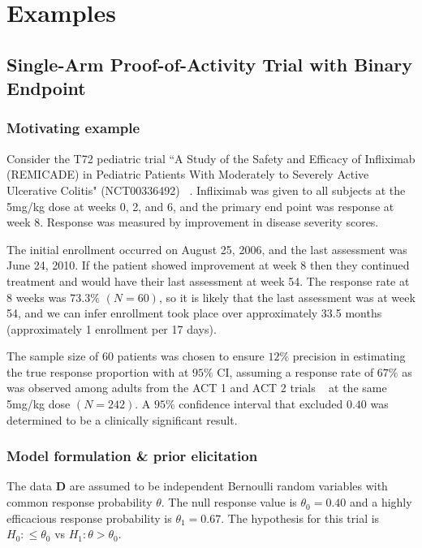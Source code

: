 \documentclass[12pt]{article}
\begin{document}

\section{Examples}\label{sec:examples}

\subsection{Single-Arm Proof-of-Activity Trial with Binary Endpoint}\label{sec:example1}
\subsubsection{Motivating example}
Consider the T72 pediatric trial ``A Study of the Safety and Efficacy of Infliximab (REMICADE) in Pediatric Patients With Moderately to Severely Active Ulcerative Colitis" (NCT00336492) ~\citep{Hyams2012}. Infliximab was given to all subjects at the 5mg/kg dose at weeks 0, 2, and 6, and the primary end point was response at week 8. Response was measured by improvement in disease severity scores.

The initial enrollment occurred on August 25, 2006, and the last assessment was June 24, 2010. If the patient showed improvement at week 8 then they continued treatment and would have their last assessment at week 54. The response rate at 8 weeks was $73.3\%$ $(N=60)$, so it is likely that the last assessment was at week 54, and we can infer enrollment took place over approximately 33.5 months (approximately 1 enrollment per 17 days). 

The sample size of $60$ patients was chosen to ensure $12\%$ precision in estimating the true response proportion with at $95\%$ CI, assuming a response rate of $67\%$ as was observed among adults from the ACT 1 and ACT 2 trials ~\citep{Rutgeerts2005} at the same 5mg/kg dose $(N=242)$. A $95\%$ confidence interval that excluded $0.40$ was determined to be a clinically significant result.

\subsubsection{Model formulation \& prior elicitation}
The data $\mathbf{D}$ are assumed to be independent Bernoulli random variables with common response probability $\theta$. The null response value is $\theta_0=0.40$ and a highly efficacious response probability is $\theta_1=0.67$. The hypothesis for this trial is $H_0:\leq \theta_0$ vs $H_1:\theta > \theta_0$.
\end{document}
